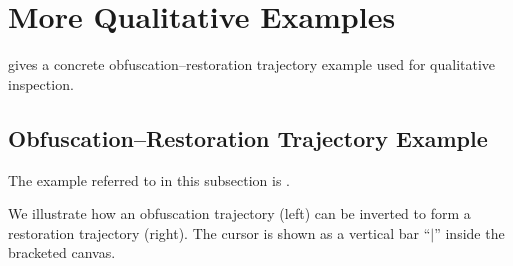 \documentclass[11pt]{article}
\begin{document}
\section{More Qualitative Examples}
 gives a concrete obfuscation--restoration trajectory example used for qualitative inspection.

\subsection{Obfuscation--Restoration Trajectory Example}
\label{sec:obf_restore_example}

The example referred to in this subsection is .

We illustrate how an obfuscation trajectory (left) can be inverted to form a restoration trajectory (right).
The cursor is shown as a vertical bar ``$\mid$'' inside the bracketed canvas.
\end{document}

